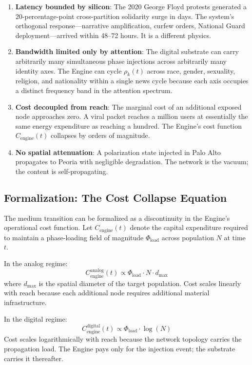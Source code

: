 \begin{enumerate}
    \item \textbf{Latency bounded by silicon}: The 2020 George Floyd protests generated a 20-percentage-point cross-partition solidarity surge in days. The system's orthogonal response---narrative amplification, curfew orders, National Guard deployment---arrived within 48--72 hours. It is a different physics.
    \item \textbf{Bandwidth limited only by attention}: The digital substrate can carry arbitrarily many simultaneous phase injections across arbitrarily many identity axes. The Engine can cycle $\rho_k(t)$ across race, gender, sexuality, religion, and nationality within a single news cycle because each axis occupies a distinct frequency band in the attention spectrum.
    \item \textbf{Cost decoupled from reach}: The marginal cost of an additional exposed node approaches zero. A viral packet reaches a million users at essentially the same energy expenditure as reaching a hundred. The Engine's cost function $C_{\text{engine}}(t)$ collapses by orders of magnitude.
    \item \textbf{No spatial attenuation}: A polarization state injected in Palo Alto propagates to Peoria with negligible degradation. The network is the vacuum; the content is self-propagating.
\end{enumerate}

\subsection{Formalization: The Cost Collapse Equation}

The medium transition can be formalized as a discontinuity in the Engine's operational cost function. Let $C_{\text{engine}}(t)$ denote the capital expenditure required to maintain a phase-loading field of magnitude $\Phi_{\text{load}}$ across population $N$ at time $t$.

In the analog regime:
\begin{equation}\label{eq:14.2a-analog-cost}
C_{\text{engine}}^{\text{analog}}(t) \propto \Phi_{\text{load}} \cdot N \cdot d_{\text{max}}
\end{equation}
where $d_{\text{max}}$ is the spatial diameter of the target population. Cost scales linearly with reach because each additional node requires additional material infrastructure.

In the digital regime:
\begin{equation}\label{eq:14.2b-digital-cost}
C_{\text{engine}}^{\text{digital}}(t) \propto \Phi_{\text{load}} \cdot \log(N)
\end{equation}
Cost scales logarithmically with reach because the network topology carries the propagation load. The Engine pays only for the injection event; the substrate carries it thereafter.

